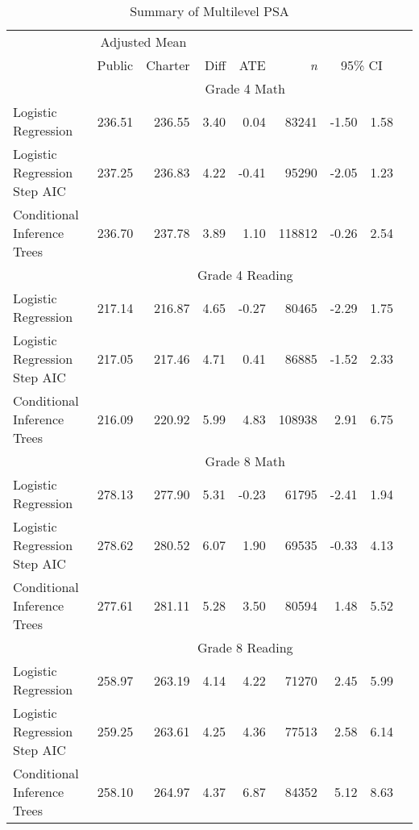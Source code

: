 \begin{table}[ht]
\caption{Summary of Multilevel PSA}
\begin{center}
\begin{tabular}{lrrrrrrrr}
\hline
 & \multicolumn{ 2}{c}{Adjusted Mean} &  & \multicolumn{1}{c}{} &  &  & \multicolumn{1}{c}{} \\ \cline{2-3}
 & Public & Charter & Diff & ATE & \textit{n} & \multicolumn{2}{c}{95\% CI} \\ \hline
 & \multicolumn{ 7}{c}{Grade 4 Math} \\ \cline{2-8}
Logistic Regression & 236.51 & 236.55 & 3.40 & 0.04 & 83241 & -1.50 & 1.58 \\ 
Logistic Regression Step AIC & 237.25 & 236.83 & 4.22 & -0.41 & 95290 & -2.05 & 1.23 \\ 
Conditional Inference Trees & 236.70 & 237.78 & 3.89 & 1.10 & 118812 & -0.26 & 2.54 \\
 & \multicolumn{ 7}{c}{Grade 4 Reading} \\ \cline{2-8}
Logistic Regression & 217.14 & 216.87 & 4.65 & -0.27 & 80465 & -2.29 & 1.75 \\ 
Logistic Regression Step AIC & 217.05 & 217.46 & 4.71 & 0.41 & 86885 & -1.52 & 2.33 \\ 
Conditional Inference Trees & 216.09 & 220.92 & 5.99 & 4.83 & 108938 & 2.91 & 6.75 \\
 & \multicolumn{ 7}{c}{Grade 8 Math} \\ \cline{2-8}
Logistic Regression & 278.13 & 277.90 & 5.31 & -0.23 & 61795 & -2.41 & 1.94 \\
Logistic Regression Step AIC & 278.62 & 280.52 & 6.07 & 1.90 & 69535 & -0.33 & 4.13 \\
Conditional Inference Trees & 277.61 & 281.11 & 5.28 & 3.50 & 80594 & 1.48 & 5.52 \\
 & \multicolumn{ 7}{c}{Grade 8 Reading} \\ \cline{2-8}
Logistic Regression & 258.97 & 263.19 & 4.14 & 4.22 & 71270 & 2.45 & 5.99 \\
Logistic Regression Step AIC & 259.25 & 263.61 & 4.25 & 4.36 & 77513 & 2.58 & 6.14 \\
Conditional Inference Trees & 258.10 & 264.97 & 4.37 & 6.87 & 84352 & 5.12 & 8.63 \\
\hline
\end{tabular}
\label{overallresults}
\end{center}
\end{table}
